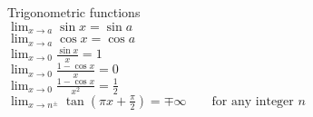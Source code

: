 \documentclass{letter}
\begin{document}
Trigonometric functions \\
$\lim_{x \to a} \sin x = \sin a $ \\
$\lim_{x \to a} \cos x = \cos a $ \\
$\lim_{x \to 0} \frac{\sin x}{x} = 1 $ \\
$\lim_{x \to 0} \frac{1-\cos x}{x} = 0 $ \\
$\lim_{x \to 0} \frac{1-\cos x}{x^2} = \frac{1}{2} $ \\
$\lim_{x \to n^\pm} \tan \left(\pi x + \frac{\pi}{2}\right) = \mp\infty \qquad \text{for any integer } n $ \\
\end{document}

